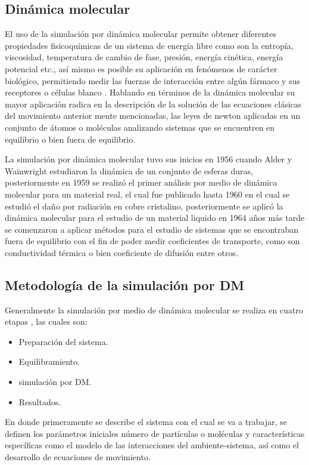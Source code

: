 \documentclass[3pt,twocolumn]{elsarticle}
\begin{document}
\subsection{Dinámica molecular}

El uso de la simulación por dinámica molecular permite obtener diferentes propiedades fisicoquímicas de un sistema de energía libre como son la entropía, viscosidad, temperatura de cambio de fase, presión, energía cinética, energía potencial etc., así mismo es posible su aplicación en fenómenos de carácter biológico, permitiendo medir las fuerzas de interacción entre algún fármaco y sus receptores o células blanco \cite{revist}. Hablando en términos de la dinámica molecular su mayor aplicación radica en la descripción de la solución de las ecuaciones clásicas del movimiento anterior mente mencionadas, las leyes de newton aplicadas en un conjunto de átomos o moléculas analizando sistemas que se encuentren en equilibrio o bien fuera de equilibrio. 

La simulación por dinámica molecular \cite{DMA} tuvo sus inicios en 1956 cuando Alder y Wainwright estudiaron la dinámica de un conjunto de esferas duras, posteriormente en 1959 se realizó el primer análisis por medio de dinámica molecular para un material real, el cual fue publicado hasta 1960 en el cual se estudió el daño por radiación en cobre cristalino, posteriormente se aplicó la dinámica molecular para el estudio de un material liquido en 1964 años más tarde se comenzaron a aplicar métodos para el estudio de sistemas que se encontraban fuera de equilibrio con el fin de poder medir coeficientes de transporte, como son conductividad térmica o bien coeficiente de difusión entre otros. 

\subsection{Metodología de la simulación por DM}
Generalmente la simulación por medio de dinámica molecular se realiza en cuatro etapas \cite{revist,Dm}, las cuales son:

\begin{itemize}
\item Preparación del sistema.
\item Equilibramiento.
\item simulación por DM.
\item Resultados.
\end{itemize}


En donde primeramente se describe el sistema con el cual se va a trabajar, se definen los parámetros iniciales número de partículas o moléculas y características específicas como el modelo de las interacciones del ambiente-sistema, así como el desarrollo de ecuaciones de movimiento.
\end{document}
